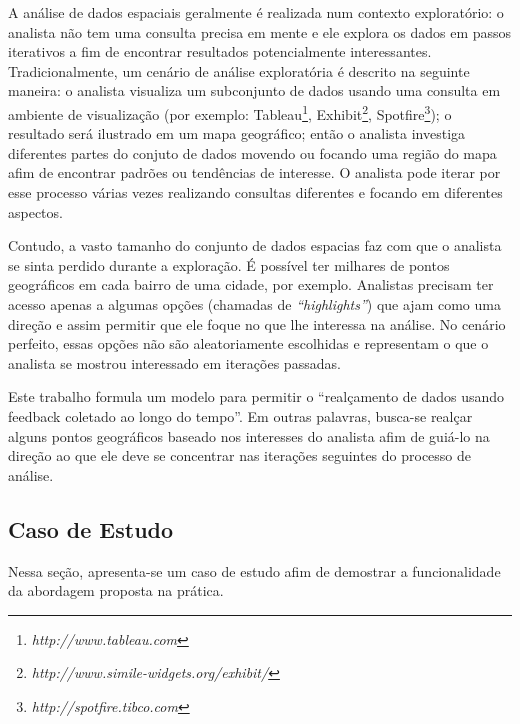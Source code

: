 A análise de dados espaciais geralmente é realizada num contexto exploratório: o analista não tem uma consulta precisa em mente e ele explora os dados em passos iterativos a fim de encontrar resultados potencialmente interessantes. Tradicionalmente, um cenário de análise exploratória é descrito na seguinte maneira: o analista visualiza um subconjunto de dados usando uma consulta em ambiente de visualização (por exemplo: Tableau\footnote{\it http://www.tableau.com},
Exhibit\footnote{\it http://www.simile-widgets.org/exhibit/},
Spotfire\footnote{\it http://spotfire.tibco.com}); o resultado será ilustrado em um mapa geográfico; então o analista investiga diferentes partes do conjuto de dados movendo ou focando uma região do mapa afim de encontrar padrões ou tendências de interesse. O analista pode iterar por esse processo várias vezes realizando consultas diferentes e focando em diferentes aspectos.

Contudo, a vasto tamanho do conjunto de dados espacias faz com que o analista se sinta perdido durante a exploração. É possível ter milhares de pontos geográficos em cada bairro de uma cidade, por exemplo. Analistas precisam ter acesso apenas a algumas opções (chamadas de {\em ``highlights''}) que ajam como uma direção e assim permitir que ele foque no que lhe interessa na análise. No cenário perfeito, essas opções não são aleatoriamente escolhidas e representam o que o analista se mostrou interessado em iterações passadas.

Este trabalho formula um modelo para permitir o ``realçamento de dados usando feedback coletado ao longo do tempo''. Em outras palavras, busca-se realçar alguns pontos geográficos baseado nos interesses do analista afim de guiá-lo na direção ao que ele deve se concentrar nas iterações seguintes do processo de análise.

\subsection{Caso de Estudo}


Nessa seção, apresenta-se um caso de estudo afim de demostrar a funcionalidade da abordagem proposta na prática.

